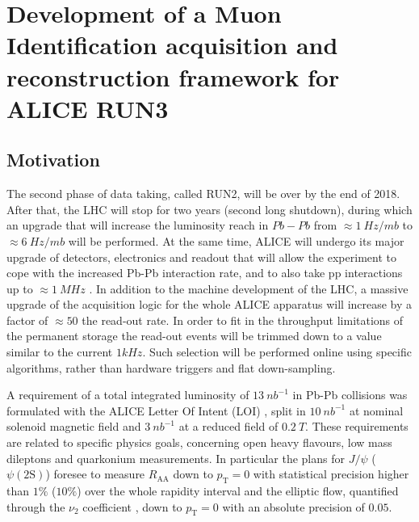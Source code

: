 \chapter{Development of a Muon Identification acquisition and reconstruction framework for ALICE RUN3}

\section{Motivation}
The second phase of data taking, called RUN2, will be over by the end of 2018. 
After that, the LHC will stop for two years (second long shutdown), during which an upgrade that will increase the luminosity reach in $Pb-Pb$ from $\approx 1\ Hz/mb$ to $\approx6\ Hz/mb$ will be performed.
At the same time, ALICE will undergo its major upgrade of detectors, electronics and readout that will allow the experiment to cope with the increased Pb-Pb interaction rate, and to also take pp interactions up to $\approx1\ MHz$ \cite{Abelev:1625842, CERN-LHCC-2013-020, CERN-LHCC-2015-001, Antonioli:1603472, Buncic:2011297}.
In addition to the machine development of the LHC, a massive upgrade of the acquisition logic for the whole ALICE apparatus will increase by a factor of $\approx50$ the read-out rate.
In order to fit in the throughput limitations of the permanent storage the read-out events will be trimmed down to a value similar to the current $1kHz$.
Such selection will be performed online using specific algorithms, rather than hardware triggers and flat down-sampling.

A requirement of a total integrated luminosity of $13\ nb^{-1}$ in Pb-Pb collisions was formulated with the ALICE Letter Of Intent (LOI) \cite{ALICE_LOI}, split in $10\ nb^{-1}$ at nominal solenoid magnetic field and $3\ nb^{-1}$ at a reduced field of $0.2\ T$.
These requirements are related to specific physics goals, concerning open heavy flavours, low mass dileptons and quarkonium measurements.
In particular the plans for $J/\psi$ ($\psi(\mathrm{2S})$) foresee to measure $R_{\mathrm{AA}}$ down to $p_{\mathrm{T}} = 0$ with statistical precision higher than $1\%$ ($10\%$) over the whole rapidity interval and the elliptic flow, quantified through the $\nu_2$ coefficient \cite{Acharya:2017tgv}, down to $p_{\mathrm{T}} = 0$ with an absolute precision of $0.05$.

